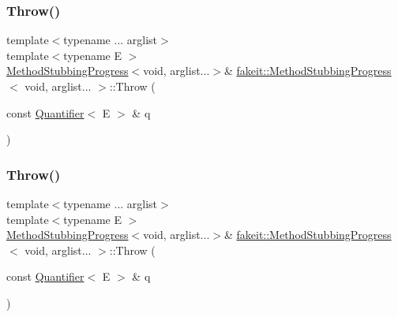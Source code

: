 \mbox{\label{structfakeit_1_1MethodStubbingProgress_3_01void_00_01arglist_8_8_8_01_4_a9eb6f25dd382ef939b775345205f42c1}} 
\subsubsection{\texorpdfstring{Throw()}{Throw()}\hspace{0.1cm}{\footnotesize\ttfamily [18/27]}}
{\footnotesize\ttfamily template$<$typename ... arglist$>$ \\
template$<$typename E $>$ \\
\mbox{\hyperlink{structfakeit_1_1MethodStubbingProgress}{Method\+Stubbing\+Progress}}$<$void, arglist...$>$\& \mbox{\hyperlink{structfakeit_1_1MethodStubbingProgress}{fakeit\+::\+Method\+Stubbing\+Progress}}$<$ void, arglist... $>$\+::Throw (\begin{DoxyParamCaption}\item[{const \mbox{\hyperlink{structfakeit_1_1Quantifier}{Quantifier}}$<$ E $>$ \&}]{q }\end{DoxyParamCaption})\hspace{0.3cm}{\ttfamily [inline]}}

\mbox{\label{structfakeit_1_1MethodStubbingProgress_3_01void_00_01arglist_8_8_8_01_4_a9eb6f25dd382ef939b775345205f42c1}} 
\subsubsection{\texorpdfstring{Throw()}{Throw()}\hspace{0.1cm}{\footnotesize\ttfamily [19/27]}}
{\footnotesize\ttfamily template$<$typename ... arglist$>$ \\
template$<$typename E $>$ \\
\mbox{\hyperlink{structfakeit_1_1MethodStubbingProgress}{Method\+Stubbing\+Progress}}$<$void, arglist...$>$\& \mbox{\hyperlink{structfakeit_1_1MethodStubbingProgress}{fakeit\+::\+Method\+Stubbing\+Progress}}$<$ void, arglist... $>$\+::Throw (\begin{DoxyParamCaption}\item[{const \mbox{\hyperlink{structfakeit_1_1Quantifier}{Quantifier}}$<$ E $>$ \&}]{q }\end{DoxyParamCaption})\hspace{0.3cm}{\ttfamily [inline]}}

